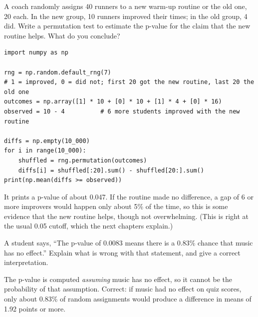 \begin{Exercise}[title={A New Warm-Up Routine}, label=si_prop]
A coach randomly assigns 40 runners to a new warm-up routine or the old one, 20 each. In the new
group, 10 runners improved their times; in the old group, 4 did. Write a permutation test to estimate
the p-value for the claim that the new routine helps. What do you conclude?
\end{Exercise}
\begin{Answer}[ref=si_prop]
\begin{verbatim}
import numpy as np

rng = np.random.default_rng(7)
# 1 = improved, 0 = did not; first 20 got the new routine, last 20 the old one
outcomes = np.array([1] * 10 + [0] * 10 + [1] * 4 + [0] * 16)
observed = 10 - 4          # 6 more students improved with the new routine

diffs = np.empty(10_000)
for i in range(10_000):
    shuffled = rng.permutation(outcomes)
    diffs[i] = shuffled[:20].sum() - shuffled[20:].sum()
print(np.mean(diffs >= observed))
\end{verbatim}
It prints a p-value of about 0.047. If the routine made no difference, a gap of 6 or more improvers
would happen only about 5\% of the time, so this is some evidence that the new routine helps, though
not overwhelming. (This is right at the usual 0.05 cutoff, which the next chapters explain.)
\end{Answer}

\begin{Exercise}[title={What the p-Value Means}, label=si_meaning]
A student says, ``The p-value of 0.0083 means there is a 0.83\% chance that music has no effect.''
Explain what is wrong with that statement, and give a correct interpretation.
\end{Exercise}
\begin{Answer}[ref=si_meaning]
The p-value is computed \emph{assuming} music has no effect, so it cannot be the probability of that
assumption. Correct: if music had no effect on quiz scores, only about 0.83\% of random assignments
would produce a difference in means of 1.92 points or more.
\end{Answer}

